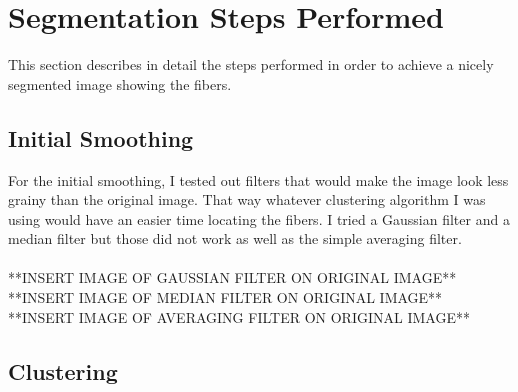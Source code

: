 \documentclass[11pt,psfig]{article}
\begin{document}
\section*{Segmentation Steps Performed}

This section describes in detail the steps performed in order to achieve a nicely segmented image showing the fibers. 

\subsection*{Initial Smoothing}

For the initial smoothing, I tested out filters that would make the image look less grainy than the original image. That way whatever clustering algorithm I was using would have an easier time locating the fibers. I tried a Gaussian filter and a median filter but those did not work as well as the simple averaging filter. \\
\\
**INSERT IMAGE OF GAUSSIAN FILTER ON ORIGINAL IMAGE**
\\
**INSERT IMAGE OF MEDIAN FILTER ON ORIGINAL IMAGE**
\\
**INSERT IMAGE OF AVERAGING FILTER ON ORIGINAL IMAGE**

\subsection*{Clustering}
\end{document}
